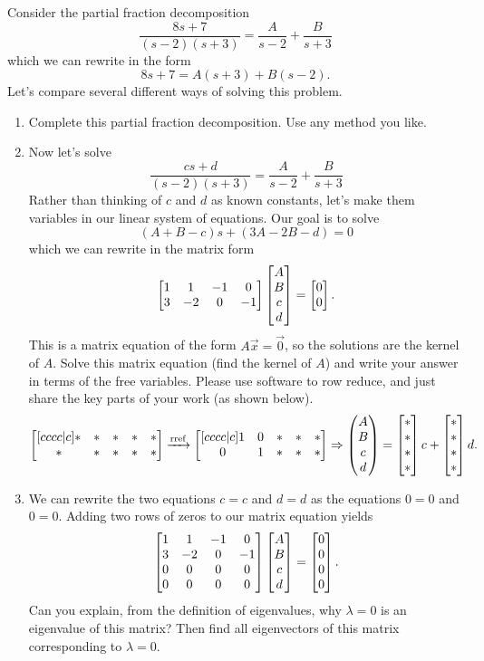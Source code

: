 \begin{problem}\label{partial fraction general solution}
Consider the partial fraction decomposition 
$$
\frac{8s+7}{(s-2)(s+3)} = \frac{A}{s-2}+\frac{B}{s+3}
$$
which we  can rewrite in the form
$$8s+7 = A(s+3)+B(s-2).$$
Let's compare several different ways of solving this problem.
\begin{enumerate}
 \item Complete this partial fraction decomposition. Use any method you like. 
 \item Now let's solve 
$$
\frac{cs+d}{(s-2)(s+3)} = \frac{A}{s-2}+\frac{B}{s+3}
$$
Rather than thinking of $c$ and $d$ as known constants, let's make them variables in our linear system of equations.  
Our goal is to solve 
$$
(A+B-c)s+(3A-2B-d)=0
$$   
which we can rewrite in the matrix form 
%
$$\begin{bmatrix} 
1 & 1 & -1 & 0 \\
3 & -2 & 0 & -1
 \end{bmatrix}\begin{bmatrix} A\\B\\c\\d \end{bmatrix}=\begin{bmatrix} 0\\0 \end{bmatrix}.$$
This is a matrix equation of the form $A\vec x=\vec 0$, so the solutions are the kernel of $A$. Solve this matrix equation (find the kernel of $A$) and write your answer in terms of the free variables. Please use software to row reduce, and just share the key parts of your work (as shown below).
$$\begin{bmatrix} [cccc|c]*&*&*&*&*\\ *&*&*&*&* \end{bmatrix}\xrightarrow{\text{rref}}\begin{bmatrix} [cccc|c]1&0&*&*&*\\ 0&1& *&*&* \end{bmatrix}\Rightarrow \begin{pmatrix} A\\B\\c\\d \end{pmatrix}=\begin{bmatrix} *\\ *\\ *\\ *  \end{bmatrix}c+\begin{bmatrix} *\\ *\\ *\\ *  \end{bmatrix}d.$$

\item 
We can rewrite the two equations $c=c$ and $d=d$ as the equations $0=0$ and $0=0$. Adding two rows of zeros to our matrix equation yields
$$\begin{bmatrix} 
1 & 1 & -1& 0 \\
3 &-2 & 0 & -1\\
0 & 0 & 0 & 0\\
0 & 0 & 0 & 0
 \end{bmatrix}\begin{bmatrix} A\\B\\c\\d \end{bmatrix}=\begin{bmatrix} 0\\0\\0\\0 \end{bmatrix}.$$
Can you explain, from the definition of eigenvalues, why $\lambda =0$ is an eigenvalue of this matrix? Then find all eigenvectors of this matrix corresponding to $\lambda=0$.


\end{enumerate}
\end{problem}
